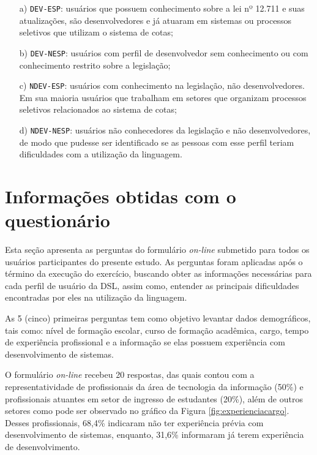 \begin{enumerate}
    \item[a)] \texttt{DEV-ESP}: usuários que possuem conhecimento sobre a lei nº 12.711 e suas atualizações, são desenvolvedores e já atuaram em sistemas ou processos seletivos que utilizam o sistema de cotas;
    \item[b)] \texttt{DEV-NESP}: usuários com perfil de desenvolvedor sem conhecimento ou com conhecimento restrito sobre a legislação;
    \item[c)] \texttt{NDEV-ESP}: usuários com conhecimento na legislação, não desenvolvedores. Em sua maioria usuários que trabalham em setores que organizam processos seletivos relacionados ao sistema de cotas;
    \item[d)] \texttt{NDEV-NESP}: usuários não conhecedores da legislação e não desenvolvedores, de modo que pudesse ser identificado se as pessoas com esse perfil teriam dificuldades com a utilização da linguagem.
\end{enumerate}


\begin{landscape}

\end{landscape}

\section{Informações obtidas com o questionário}
\label{sec:perguntasaplicadas}

Esta seção apresenta as perguntas do formulário \textit{on-line} submetido para todos os usuários participantes do presente estudo. As perguntas foram aplicadas após o término da execução do exercício, buscando obter as informações necessárias para cada perfil de usuário da DSL, assim como, entender as principais dificuldades encontradas por eles na utilização da linguagem.

As 5 (cinco) primeiras perguntas tem como objetivo levantar dados demográficos, tais como: nível de formação escolar, curso de formação acadêmica, cargo, tempo de experiência profissional e a informação se elas possuem experiência com desenvolvimento de sistemas.

O formulário \textit{on-line} recebeu 20 respostas, das quais contou com a representatividade de profissionais da área de tecnologia da informação (50\%) e profissionais atuantes em setor de ingresso de estudantes (20\%), além de outros setores como pode ser observado no gráfico da Figura \ref{fig:experienciacargo}. Desses profissionais, 68,4\% indicaram não ter experiência prévia com desenvolvimento de sistemas, enquanto, 31,6\% informaram já terem experiência de desenvolvimento.

